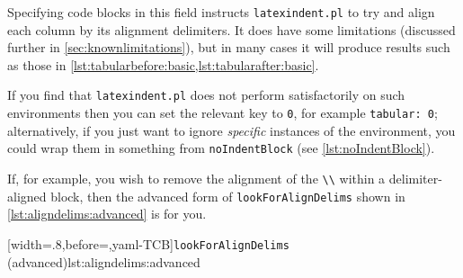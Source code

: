  Specifying code blocks in this field instructs \texttt{latexindent.pl} to try and align
 each column by its alignment delimiters. It does have some limitations (discussed further
 in \cref{sec:knownlimitations}), but in many cases it will produce results such as those
 in \cref{lst:tabularbefore:basic,lst:tabularafter:basic}.

 \begin{cmhtcbraster}
 \end{cmhtcbraster}

 If you find that \texttt{latexindent.pl} does not perform satisfactorily on such
 environments then you can set the relevant key to \texttt{0}, for example
 \texttt{tabular: 0}; alternatively, if you just want to ignore \emph{specific} instances
 of the environment, you could wrap them in something from \texttt{noIndentBlock} (see
 \vref{lst:noIndentBlock}).

 If, for example, you wish to remove the alignment of the \lstinline!\\! within a
 delimiter-aligned block, then the advanced form of \texttt{lookForAlignDelims} shown in
 \cref{lst:aligndelims:advanced} is for you. 
    

 [width=.8\linewidth,before=\centering,yaml-TCB]{\texttt{lookForAlignDelims} (advanced)}{lst:aligndelims:advanced}

